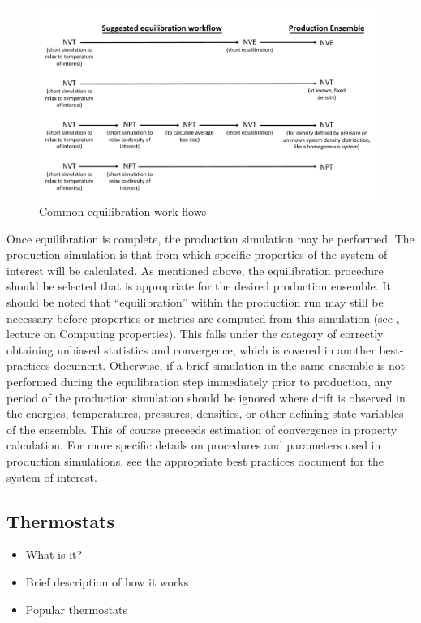 \documentclass[9pt,bestpractices]{livecoms}
\begin{document}
\begin{figure}[h]
\centering
\includegraphics[width=\linewidth]{Equilibration_Workflow.pdf}
\caption{Common equilibration work-flows}
\label{eqworkflow}
\end{figure}

Once equilibration is complete, the production simulation may be performed.
The production simulation is that from which specific properties of the system of interest will be calculated.
As mentioned above, the equilibration procedure should be selected that is appropriate for the desired production ensemble.
It should be noted that ``equilibration'' within the production run may still be necessary before properties or metrics are computed from this simulation (see \citet{ShellNotes}, lecture on Computing properties).
This falls under the category of correctly obtaining unbiased statistics and convergence, which is covered in another best-practices document. %
Otherwise, if a brief simulation in the same ensemble is not performed during the equilibration step immediately prior to production, any period of the production simulation should be ignored where drift is observed in the energies, temperatures, pressures, densities, or other defining state-variables of the ensemble.
This of course preceeds estimation of convergence in property calculation.
For more specific details on procedures and parameters used in production simulations, see the appropriate best practices document for the system of interest.

\subsection{Thermostats}
\begin{itemize}
\item What is it?
\item Brief description of how it works
\item Popular thermostats
\end{itemize}
\end{document}
